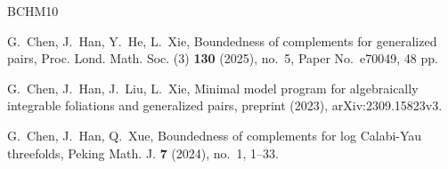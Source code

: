 \documentclass[12pt]{amsart}
\theoremstyle{definition}
\begin{document}
\begin{thebibliography}{BCHM10}





 G.~Chen, J.~Han, Y.~He, L.~Xie, Boundedness of complements for generalized pairs, Proc. Lond. Math. Soc. (3) {\textbf{130}} (2025), no.~5, Paper No.~e70049, 48 pp. 


 G.~Chen, J.~Han, J.~Liu, L.~Xie,  Minimal model program for algebraically integrable foliations and generalized pairs, preprint (2023), arXiv:2309.15823v3. 


 G.~Chen, J.~Han, Q.~Xue, Boundedness of complements for log Calabi-Yau threefolds, Peking Math. J. {\textbf{7}} (2024), no.~1, 1--33.









\end{thebibliography}
\end{document}
